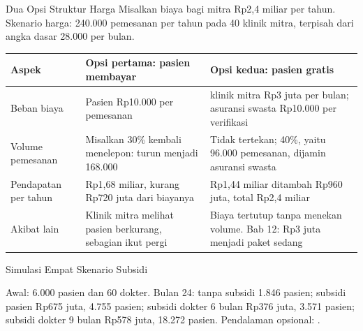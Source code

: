 \documentclass[aspectratio=169, table, 12pt]{beamer}
\begin{document}
\begin{frame}{{\Large Dua Opsi Struktur Harga}}
  \small Misalkan biaya bagi mitra Rp2,4 miliar per tahun. Skenario harga: 240.000 pemesanan per tahun pada 40 klinik mitra, terpisah dari angka dasar 28.000 per bulan.

  \vspace{2pt}
  \footnotesize
  \begin{tabularx}{\textwidth}{>{\raggedright\arraybackslash}p{2.6cm}
      >{\raggedright\arraybackslash}X
      >{\raggedright\arraybackslash}X}
    \hline
    \textbf{Aspek} & \textbf{Opsi pertama: pasien membayar} & \textbf{Opsi kedua: pasien gratis} \\ \hline
    Beban biaya & Pasien Rp10.000 per pemesanan & 40 klinik mitra Rp3 juta per bulan; asuransi swasta Rp10.000 per verifikasi \\ \hline
    Volume pemesanan & Misalkan 30\% kembali menelepon: turun menjadi 168.000 & Tidak tertekan; 40\%, yaitu 96.000 pemesanan, dijamin asuransi swasta \\ \hline
    Pendapatan per tahun & Rp1,68 miliar, kurang Rp720 juta dari biayanya & Rp1,44 miliar ditambah Rp960 juta, total Rp2,4 miliar \\ \hline
    Akibat lain & Klinik mitra melihat pasien berkurang, sebagian ikut pergi & Biaya tertutup tanpa menekan volume. Bab 12: Rp3 juta menjadi paket sedang \\ \hline
  \end{tabularx}
\end{frame}

\begin{frame}{{\Large Simulasi Empat Skenario Subsidi}}
  \centering
  \resizebox{!}{0.6\textheight}{}

  \vspace{2pt}
  \raggedright
  {\scriptsize Awal: 6.000 pasien dan 60 dokter. Bulan 24: tanpa subsidi 1.846 pasien; subsidi pasien Rp675 juta, 4.755 pasien; subsidi dokter 6 bulan Rp376 juta, 3.571 pasien; subsidi dokter 9 bulan Rp578 juta, 18.272 pasien. Pendalaman opsional: .\par}
\end{frame}
\end{document}
